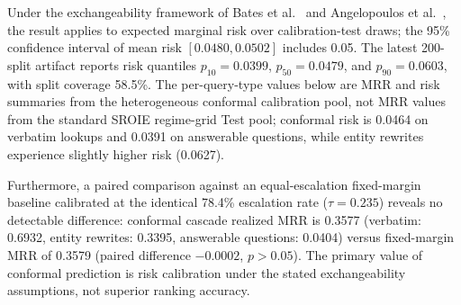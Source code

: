 \documentclass[conference]{IEEEtran}
\begin{document}
Under the exchangeability framework of Bates et al.~\cite{bates2021conformal} and Angelopoulos et al.~\cite{angelopoulos2021gentle}, the result applies to expected marginal risk over calibration-test draws; the 95\% confidence interval of mean risk $[0.0480, 0.0502]$ includes 0.05. The latest 200-split artifact reports risk quantiles $p_{10} = 0.0399$, $p_{50} = 0.0479$, and $p_{90} = 0.0603$, with split coverage 58.5\%. The per-query-type values below are MRR and risk summaries from the heterogeneous conformal calibration pool, not MRR values from the standard SROIE regime-grid Test pool; conformal risk is 0.0464 on verbatim lookups and 0.0391 on answerable questions, while entity rewrites experience slightly higher risk (0.0627).

Furthermore, a paired comparison against an equal-escalation fixed-margin baseline calibrated at the identical 78.4\% escalation rate ($\tau = 0.235$) reveals no detectable difference: conformal cascade realized MRR is 0.3577 (verbatim: 0.6932, entity rewrites: 0.3395, answerable questions: 0.0404) versus fixed-margin MRR of 0.3579 (paired difference $-0.0002$, $p > 0.05$). The primary value of conformal prediction is risk calibration under the stated exchangeability assumptions, not superior ranking accuracy.

\begin{table}[t]
\centering\small
\caption{Conformal Cascade Calibration: Corrected Marginal Loss, High-Probability RCPS ($\delta=0.10$), and Equal-Escalation Baseline over 200 Cluster-Aware Splits ($N=2{,}754$ instances, nominal target $\epsilon=0.05$).}\label{tab:conformal_cascade_v6}
\end{table}
\end{document}
